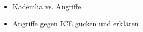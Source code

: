 \begin{itemize}
    \item Kademlia vs. Angriffe
    \item Angriffe gegen ICE gucken und erklären
\end{itemize}

